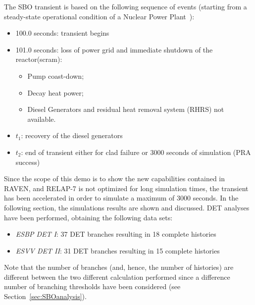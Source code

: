 \documentclass{mc2013}
\begin{document}
The SBO transient is based on the following sequence of events (starting from a steady-state operational condition of a Nuclear Power Plant~\cite{relap7FY12}):
\vspace{-5mm}
 \begin{itemize}
   \item 100.0 seconds: transient begins
   \item 101.0 seconds: loss of power grid and immediate shutdown of the reactor(scram):
   \begin{itemize}
       \item Pump coast-down;  
       \item Decay heat power;
       \item Diesel Generators and residual heat removal system (RHRS) not available. 
    \end{itemize}
   \item $t_{1}$: recovery of the diesel generators
   \item $t_{2}$: end of transient either for clad failure or 3000 seconds of simulation (PRA success)
\end{itemize}
\vspace{-5mm}
Since the scope of this demo is to show the new capabilities contained in RAVEN, and RELAP-7 is not optimized for long simulation times, the transient has been accelerated in order to simulate a maximum of 3000 seconds. 
In the following section, the simulations results are shown and discussed.
DET analyses have been performed, obtaining the following data sets:
\vspace{-5mm}
\begin{itemize}
\item \emph{ESBP DET I}: 37 DET branches resulting in 18 complete histories
\item \emph{ESVV DET II}: 31 DET branches resulting in 15 complete histories
\end{itemize}
\vspace{-5mm}
Note that the number of branches (and, hence, the number of histories) are different between the two different calculation performed since a difference number of branching thresholds have been considered (see Section~\ref{sec:SBOanalysis}).
\end{document}
